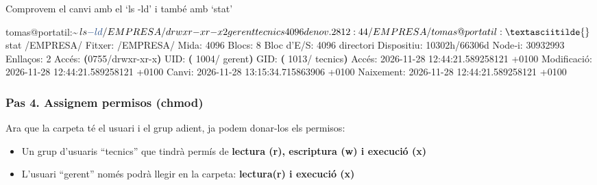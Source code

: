 \documentclass[
  catalan,
  a4paper,
]{article}
\newenvironment{Shaded}{\begin{snugshade}}{\end{snugshade}}
\newcommand{\AttributeTok}[1]{\textcolor[rgb]{0.13,0.29,0.53}{#1}}
\newcommand{\ErrorTok}[1]{\textcolor[rgb]{0.64,0.00,0.00}{\textbf{#1}}}
\newcommand{\ExtensionTok}[1]{#1}
\newcommand{\KeywordTok}[1]{\textcolor[rgb]{0.13,0.29,0.53}{\textbf{#1}}}
\newcommand{\NormalTok}[1]{#1}
\providecommand{\tightlist}{%
  \setlength{\itemsep}{0pt}\setlength{\parskip}{0pt}}
\begin{document}
\begin{Shaded}
\end{Shaded}

Comprovem el canvi amb el `ls -ld' i també amb `stat'

\begin{Shaded}
\begin{Highlighting}[]
\ExtensionTok{tomas@portatil:\textasciitilde{}$}\NormalTok{ ls }\AttributeTok{{-}ld}\NormalTok{ /EMPRESA/}
\ExtensionTok{drwxr{-}xr{-}x}\NormalTok{ 2 gerent tecnics 4096 de nov.  28 12:44 /EMPRESA/}
\ExtensionTok{tomas@portatil:\textasciitilde{}$}\NormalTok{ stat /EMPRESA/}
\ExtensionTok{Fitxer:}\NormalTok{ /EMPRESA/}
       \ExtensionTok{Mida:}\NormalTok{ 4096       Blocs: 8          Bloc d’E/S: 4096   directori}
\ExtensionTok{Dispositiu:}\NormalTok{ 10302h/66306d   Node‐i: 30932993    Enllaços: 2}
\ExtensionTok{Accés:} \ErrorTok{(}\ExtensionTok{0755/drwxr{-}xr{-}x}\KeywordTok{)}  \ExtensionTok{UID:} \ErrorTok{(} \ExtensionTok{1004/}\NormalTok{  gerent}\KeywordTok{)}   \ExtensionTok{GID:} \ErrorTok{(} \ExtensionTok{1013/}\NormalTok{ tecnics}\KeywordTok{)}
\ExtensionTok{Accés:}\NormalTok{ 2026{-}11{-}28 12:44:21.589258121 +0100}
\ExtensionTok{Modificació:}\NormalTok{ 2026{-}11{-}28 12:44:21.589258121 +0100}
      \ExtensionTok{Canvi:}\NormalTok{ 2026{-}11{-}28 13:15:34.715863906 +0100}
  \ExtensionTok{Naixement:}\NormalTok{ 2026{-}11{-}28 12:44:21.589258121 +0100}
\end{Highlighting}
\end{Shaded}

\subsubsection{Pas 4. Assignem permisos
(chmod)}\label{pas-4.-assignem-permisos-chmod}

Ara que la carpeta té el usuari i el grup adient, ja podem donar-los els
permisos:

\begin{itemize}
\tightlist
\item
  Un grup d'usuaris ``tecnics'' que tindrà permís de \textbf{lectura
  (r), escriptura (w) i execució (x)}
\item
  L'usuari ``gerent'' només podrà llegir en la carpeta:
  \textbf{lectura(r) i execució (x)}
\end{itemize}
\end{document}
